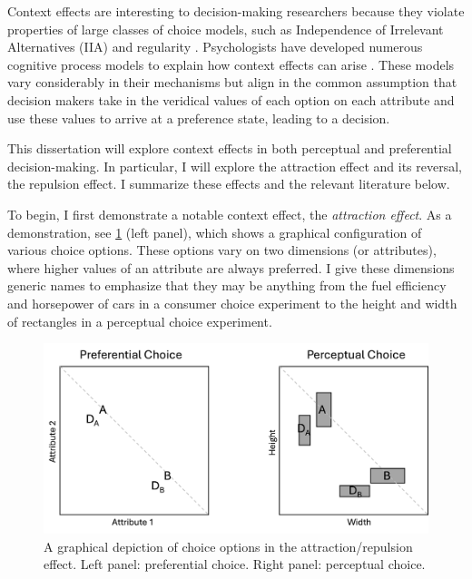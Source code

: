\documentclass{umassthesis}          %
\begin{document}
Context effects are interesting to decision-making researchers because they violate properties of large classes of choice models, such as Independence of Irrelevant Alternatives (IIA) \parencite{ray1973independence} and regularity \parencite{mcfadden2001economic}. Psychologists have developed numerous cognitive process models to explain how context effects can arise \parencite{roeMultialternativeDecisionField2001a,usherLossAversionInhibition2004a,truebloodMultiattributeLinearBallistic,wollschlager2NaryChoiceTree2012a,bergnerVAMPVotingAgent2019b,noguchiMultialternativeDecisionSampling2018a,bhatiaAssociationsAccumulationPreference2013b,tversky1993context}. These models vary considerably in their mechanisms but align in the common assumption that decision makers take in the veridical values of each option on each attribute and use these values to arrive at a preference state, leading to a decision. 

This dissertation will explore context effects in both perceptual and preferential decision-making. In particular, I will explore the attraction effect and its reversal, the repulsion effect. I summarize these effects and the relevant literature below.

To begin, I first demonstrate a notable context effect, the \textit{attraction effect}. As a demonstration, see \ref{fig:fig_opts} (left panel), which shows a graphical configuration of various choice options. These options vary on two dimensions (or attributes), where higher values of an attribute are always preferred. I give these dimensions generic names to emphasize that they may be anything from the fuel efficiency and horsepower of cars in a consumer choice experiment to the height and width of rectangles in a perceptual choice experiment.

\begin{figure}
  \includegraphics[width=\linewidth]{figures/pref_v_percep.jpg}
  \caption{A graphical depiction of choice options in the attraction/repulsion effect. Left panel: preferential choice. Right panel: perceptual choice.}
  \label{fig:fig_opts}
\end{figure}
\end{document}
